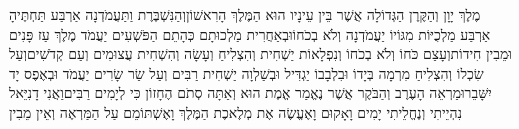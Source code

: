 \documentclass[../main/main.tex]{subfiles}
\begin{document}
\begin{multicols*}{\ncols}
מֶלֶךְ יָוָן וְהַקֶּרֶן הַגְּדוֹלָה אֲשֶׁר בֵּין עֵינָיו הוּא הַמֶּלֶךְ הָרִאשׁוֹן\PreVerseSpace{}וְהַנִּשְׁבֶּרֶת וַתַּעֲמֹדְנָה אַרְבַּע תַּחְתֶּיהָ אַרְבַּע מַלְכֻיּוֹת מִגּוֹיוֹ\SubEnd{} יַעֲמֹדְנָה וְלֹא בְכֹחוֹ\PreVerseSpace{}וּבְאַחֲרִית מַלְכוּתָם כְּהָתֵם הַפֹּשְׁעִים יַעֲמֹד מֶלֶךְ עַז פָּנִים וּמֵבִין חִידוֹת\PreVerseSpace{}וְעָצַם כֹּחוֹ וְלֹא בְכֹחוֹ וְנִפְלָאוֹת יַשְׁחִית וְהִצְלִיחַ וְעָשָׂה וְהִשְׁחִית עֲצוּמִים וְעַם קְדֹשִׁים\PreVerseSpace{}וְעַל שִׂכְלוֹ וְהִצְלִיחַ מִרְמָה בְּיָדוֹ וּבִלְבָבוֹ יַגְדִּיל וּבְשַׁלְוָה יַשְׁחִית רַבִּים וְעַל שַׂר שָׂרִים יַעֲמֹד וּבְאֶפֶס יָד יִשָּׁבֵר\PreVerseSpace{}וּמַרְאֵה הָעֶרֶב וְהַבֹּקֶר אֲשֶׁר נֶאֱמַר אֱמֶת הוּא וְאַתָּה סְתֹם הֶחָזוֹן כִּי לְיָמִים רַבִּים\PreVerseSpace{}וַאֲנִי דָנִיֵּאל נִהְיֵיתִי וְנֶחֱלֵיתִי יָמִים וָאָקוּם וָאֶעֱשֶׂה אֶת מְלֶאכֶת הַמֶּלֶךְ וָאֶשְׁתּוֹמֵם עַל הַמַּרְאֶה וְאֵין מֵבִין\OpenSection{}\par

\end{multicols*}
\end{document}
